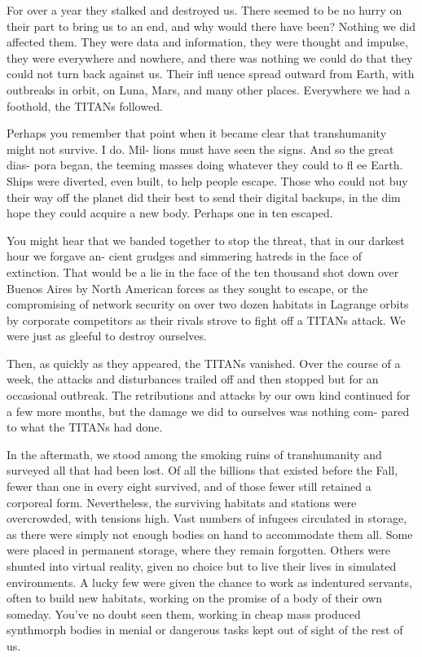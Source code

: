 For over a year they stalked and destroyed us. 
There seemed to be no hurry on their part to bring us 
to an end, and why would there have been? Nothing 
we did affected them. They were data and information, 
they were thought and impulse, they were everywhere 
and nowhere, and there was nothing we could do that 
they could not turn back against us. Their infl uence 
spread outward from Earth, with outbreaks in orbit, 
on Luna, Mars, and many other places. Everywhere 
we had a foothold, the TITANs followed.

Perhaps you remember that point when it became 
clear that transhumanity might not survive. I do. Mil-
lions must have seen the signs. And so the great dias-
pora began, the teeming masses doing whatever they 
could to fl ee Earth. Ships were diverted, even built, to 
help people escape. Those who could not buy their 
way off the planet did their best to send their digital 
backups, in the dim hope they could acquire a new 
body. Perhaps one in ten escaped.

You might hear that we banded together to stop 
the threat, that in our darkest hour we forgave an-
cient grudges and simmering hatreds in the face of 
extinction. That would be a lie in the face of the ten 
thousand shot down over Buenos Aires by North 
American forces as they sought to escape, or the 
compromising of network security on over two dozen 
habitats in Lagrange orbits by corporate competitors 
as their rivals strove to fight off a TITANs attack. We 
were just as gleeful to destroy ourselves.

Then, as quickly as they appeared, the TITANs 
vanished. Over the course of a week, the attacks and 
disturbances trailed off and then stopped but for an 
occasional outbreak. The retributions and attacks by 
our own kind continued for a few more months, but 
the damage we did to ourselves was nothing com-
pared to what the TITANs had done.

In the aftermath, we stood among the smoking 
ruins of transhumanity and surveyed all that had 
been lost. Of all the billions that existed before 
the Fall, fewer than one in every eight survived, 
and of those fewer still retained a corporeal form. 
Nevertheless, the surviving habitats and stations 
were overcrowded, with tensions high. Vast numbers 
of infugees circulated in storage, as there were simply 
not enough bodies on hand to accommodate them 
all. Some were placed in permanent storage, where 
they remain forgotten. Others were shunted into 
virtual reality, given no choice but to live their lives 
in simulated environments. A lucky few were given 
the chance to work as indentured servants, often 
to build new habitats, working on the promise of a 
body of their own someday. You've no doubt seen 
them, working in cheap mass produced synthmorph 
bodies in menial or dangerous tasks kept out of sight 
of the rest of us.

